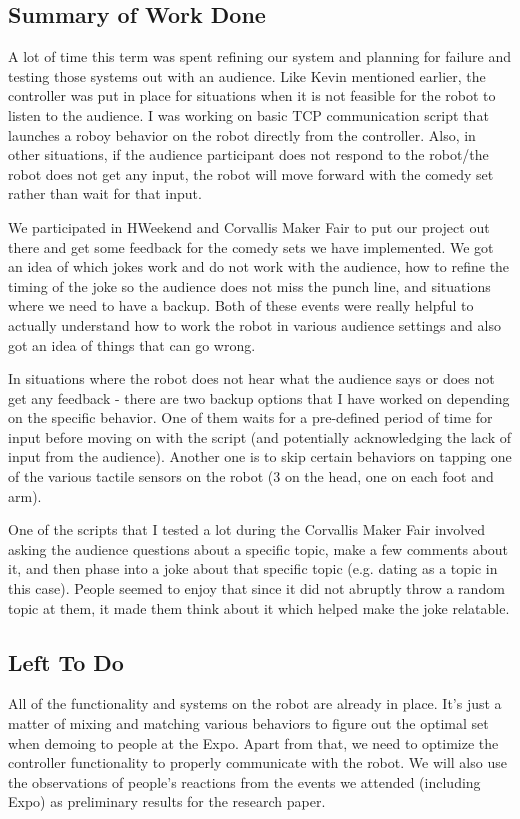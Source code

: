 \documentclass[onecolumn, draftclsnofoot,10pt, compsoc]{IEEEtran}
\begin{document}
\subsection{Summary of Work Done}
A lot of time this term was spent refining our system and planning for failure and testing those systems out with an audience. Like Kevin mentioned earlier, the controller was put in place for situations when it is not feasible for the robot to listen to the audience. I was working on basic TCP communication script that launches a roboy behavior on the robot directly from the controller.  Also, in other situations, if the audience participant does not respond to the robot/the robot does not get any input, the robot will move forward with the comedy set rather than wait for that input. 

We participated in HWeekend and Corvallis Maker Fair to put our project out there and get some feedback for the comedy sets we have implemented. We got an idea of which jokes work and do not work with the audience, how to refine the timing of the joke so the audience does not miss the punch line, and situations where we need to have a backup. Both of these events were really helpful to actually understand how to work the robot in various audience settings and also got an idea of things that can go wrong. 

In situations where the robot does not hear what the audience says or does not get any feedback - there are two backup options that I have worked on depending on the specific behavior. One of them waits for a pre-defined period of time for input before moving on with the script (and potentially acknowledging the lack of input from the audience). Another one is to skip certain behaviors on tapping one of the various tactile sensors on the robot (3 on the head, one on each foot and arm).

One of the scripts that I tested a lot during the Corvallis Maker Fair involved asking the audience questions about a specific topic, make a few comments about it, and then phase into a joke about that specific topic (e.g. dating as a topic in this case). People seemed to enjoy that since it did not abruptly throw a random topic at them, it made them think about it which helped make the joke relatable. 

\subsection{Left To Do}
All of the functionality and systems on the robot are already in place. It's just a matter of mixing and matching various behaviors to figure out the optimal set when demoing to people at the Expo. Apart from that, we need to optimize the controller functionality to properly communicate with the robot. We will also use the observations of people's reactions from the events we attended (including Expo) as preliminary results for the research paper. 
\end{document}
